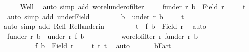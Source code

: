\begin{isabellebody}
\ \ \ \isamarkupfalse%
\ Well{\isacharprime}{\kern0pt}\ \isamarkupfalse%
\ {\isacharparenleft}{\kern0pt}auto\ simp\ add{\isacharcolon}{\kern0pt}\ wo{\isacharunderscore}{\kern0pt}rel{\isachardot}{\kern0pt}under{\isacharunderscore}{\kern0pt}ofilter{\isacharparenright}{\kern0pt}\isanewline
\ \ \ \isamarkupfalse%
\ {\isachardoublequoteopen}f{\isacharbackquote}{\kern0pt}{\isacharparenleft}{\kern0pt}under\ r\ b{\isacharparenright}{\kern0pt}\ {\isasymle}\ Field\ r{\isacharprime}{\kern0pt}{\isachardoublequoteclose}\isanewline
\ \ \ \isamarkupfalse%
\ t{}\ \isamarkupfalse%
\ {\isacharparenleft}{\kern0pt}auto\ simp\ add{\isacharcolon}{\kern0pt}\ under{\isacharunderscore}{\kern0pt}Field{\isacharparenright}{\kern0pt}\isanewline
\ \ \ \isamarkupfalse%
\isanewline
\ \ \ \isamarkupfalse%
\ {\isachardoublequoteopen}b\ {\isasymin}\ under\ r\ b{\isachardoublequoteclose}\isanewline
\ \ \ \isamarkupfalse%
\ t{}\ \isamarkupfalse%
{\isacharparenleft}{\kern0pt}auto\ simp\ add{\isacharcolon}{\kern0pt}\ Refl\ Refl{\isacharunderscore}{\kern0pt}under{\isacharunderscore}{\kern0pt}in{\isacharparenright}{\kern0pt}\isanewline
\ \ \ \isamarkupfalse%
\isanewline
\ \ \ \isamarkupfalse%
\ t{}{\isacharcolon}{\kern0pt}\ \ {\isachardoublequoteopen}f\ b\ {\isasymin}\ Field\ r{\isacharprime}{\kern0pt}{\isachardoublequoteclose}\ \isamarkupfalse%
\ auto\isanewline
\ \ \ \isamarkupfalse%
\ {\isachardoublequoteopen}f{\isacharbackquote}{\kern0pt}{\isacharparenleft}{\kern0pt}under\ r\ b{\isacharparenright}{\kern0pt}\ {\isacharequal}{\kern0pt}\ under\ r{\isacharprime}{\kern0pt}\ {\isacharparenleft}{\kern0pt}f\ b{\isacharparenright}{\kern0pt}\ {\isasymand}\isanewline
\ \ \ \ \ \ \ \ \ wo{\isacharunderscore}{\kern0pt}rel{\isachardot}{\kern0pt}ofilter\ r{\isacharprime}{\kern0pt}\ {\isacharparenleft}{\kern0pt}f{\isacharbackquote}{\kern0pt}{\isacharparenleft}{\kern0pt}under\ r\ b{\isacharparenright}{\kern0pt}{\isacharparenright}{\kern0pt}\ {\isasymand}\isanewline
\ \ \ \ \ \ \ \ \ f\ b\ {\isasymin}\ Field\ r{\isacharprime}{\kern0pt}{\isachardoublequoteclose}\isanewline
\ \ \ \isamarkupfalse%
\ t{}\ t{}\ t{}\ \isamarkupfalse%
\ auto\isanewline
\ \ \isacommand{{\isacharbraceright}{\kern0pt}}\isamarkupfalse%
\isanewline
\ \ \isamarkupfalse%
\ bFact{\isacharcolon}{\kern0pt}\isanewline

\end{isabellebody}
